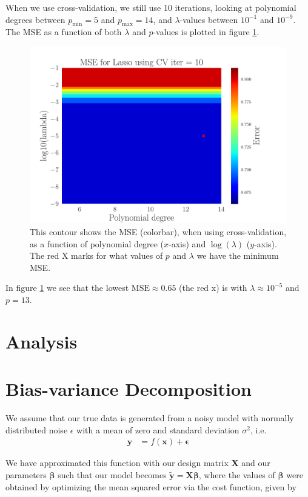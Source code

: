 \documentclass[reprint,english,notitlepage,aps,nobalancelastpage,nofootinbib]{revtex4-1}  %
\begin{document}
When we use cross-validation, we still use 10 iterations, looking at polynomial degrees between $p_\text{min} = 5$ and $p_\text{max} = 14$, and $\lambda$-values between $10^{-1}$ and $10^{-9}$. The MSE as a function of both $\lambda$ and $p$-values is plotted in figure \ref{fig:terrain_Lasso_MSE_CV}.
\begin{figure}[h]
	\includegraphics[width=0.8\linewidth]{SRTM_Contour_PL_Lasso_CV10_n50_eps0.2_p5_14_lmbm1_m9.pdf}
	\caption{This contour shows the MSE (colorbar), when using cross-validation, as a function of polynomial degree ($x$-axis) and $\log(\lambda)$ ($y$-axis). The red X marks for what values of $p$ and $\lambda$ we have the minimum MSE.}
	\label{fig:terrain_Lasso_MSE_CV}
\end{figure}
In figure \ref{fig:terrain_Lasso_MSE_CV} we see that the lowest $\text{MSE} \approx 0.65$ (the red x) is with $\lambda \approx 10^{-5}$ and $p = 13$.

\section*{Analysis}

\clearpage
\appendix

\section{Bias-variance Decomposition}\label{Apx:BVT}

We assume that our true data is generated from a noisy model with normally distributed noise $\epsilon$ with a mean of zero and standard deviation $\sigma^2$, i.e.
\begin{align*}
  \mathbf{y} &= f(\mathbf{x}) + \bm{\epsilon}
\end{align*}

We have approximated this function with our design matrix $\mathbf{X}$ and our parameters $\bm{\beta}$ such that our model becomes $\mathbf{\tilde{y}}=\mathbf{X}\bm{\beta}$, where the values of $\bm{\beta}$ were obtained by optimizing the mean squared error via the cost function, given by
\end{document}
